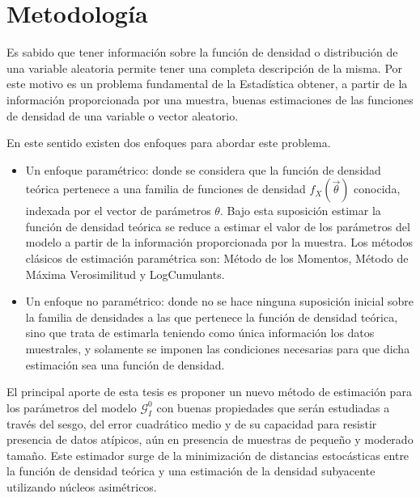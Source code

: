
\chapter{Metodología}

Es sabido que tener información sobre la función de densidad o distribución de una variable aleatoria permite tener una completa descripción de la misma. Por este motivo es un problema fundamental de la Estadística obtener, a partir de la información proporcionada por una muestra,  buenas estimaciones de las funciones de densidad de una variable o vector aleatorio. 

En este sentido existen dos enfoques para abordar este problema. 

\begin{itemize}
	\item Un enfoque paramétrico: donde se considera que la función de densidad teórica pertenece a una familia de funciones de densidad $f_X(\vec{\theta})$ conocida, indexada por el vector de parámetros $\theta$. Bajo esta suposición estimar la función de densidad teórica se reduce a estimar el valor de los parámetros del modelo a partir de la información proporcionada por la muestra. Los métodos clásicos de estimación paramétrica son: Método de los Momentos, Método de Máxima Verosimilitud y LogCumulants.
	\item Un enfoque no paramétrico: donde no se hace ninguna suposición inicial sobre la familia de densidades a las que pertenece la función de densidad teórica, sino que trata de estimarla teniendo como única información los datos muestrales, y solamente se imponen las condiciones necesarias para que dicha estimación sea una función de densidad.
\end{itemize}

El principal aporte de esta tesis es proponer un nuevo método de estimación para los parámetros del modelo $\mathcal G_I^0$ con buenas propiedades que serán estudiadas a través del sesgo, del error cuadrático medio y de su capacidad para resistir presencia de datos atípicos, aún en presencia de muestras de pequeño y moderado tamaño. Este estimador surge de la minimización de distancias estocásticas entre la función de densidad teórica y una estimación de la densidad subyacente utilizando núcleos asimétricos. 


